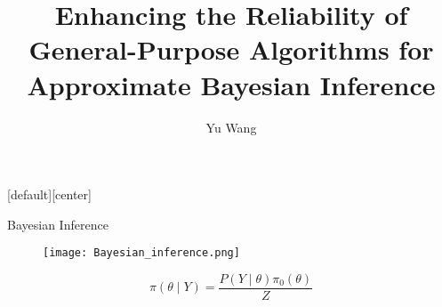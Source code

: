 \documentclass[10pt,xcolor=table]{beamer}
\title{Enhancing the Reliability of General-Purpose Algorithms for Approximate Bayesian Inference}
\author{Yu Wang}
\begin{document}
{
\maketitle
}

[default][center]



\begin{frame}{Bayesian Inference}
\begin{figure}
\texttt{[image: Bayesian\_inference.png]}
\end{figure}
	
	\begin{equation*}
		\pi\left(\theta \mid Y \right)=\frac{P(Y \mid \theta) \pi_0(\theta)}{Z}
	\end{equation*}
	
\end{frame}
\end{document}
